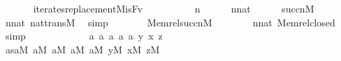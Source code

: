 \begin{isabellebody}
\ \ \isanewline
\ \ \ \ {\isachardoublequoteopen}iterates{\isacharunderscore}{\kern0pt}replacement{\isacharparenleft}{\kern0pt}{\isacharhash}{\kern0pt}{\isacharhash}{\kern0pt}M{\isacharcomma}{\kern0pt}is{\isacharunderscore}{\kern0pt}F{\isacharcomma}{\kern0pt}v{\isacharparenright}{\kern0pt}{\isachardoublequoteclose}\isanewline
%
\isadelimproof
%
\endisadelimproof
%
\isatagproof
{}\isamarkupfalse%
\ {\isacharminus}{\kern0pt}\isanewline
\ \ \isacommand{{\isacharbraceleft}{\kern0pt}}\isamarkupfalse%
\isanewline
\ \ \ \ \isamarkupfalse%
\ n\isanewline
\ \ \ \ \isamarkupfalse%
\ {\isachardoublequoteopen}n{\isasymin}nat{\isachardoublequoteclose}\isanewline
\ \ \ \ \isamarkupfalse%
\ {\isachardoublequoteopen}succ{\isacharparenleft}{\kern0pt}n{\isacharparenright}{\kern0pt}{\isasymin}M{\isachardoublequoteclose}\isanewline
\ \ \ \ \ \ \isamarkupfalse%
\ {\isacartoucheopen}n{\isasymin}nat{\isacartoucheclose}\ nat{\isacharunderscore}{\kern0pt}trans{\isacharunderscore}{\kern0pt}M\ \isamarkupfalse%
\ simp\isanewline
\ \ \ \ \isamarkupfalse%
\ \isamarkupfalse%
\ {}{\isacharcolon}{\kern0pt}{\isachardoublequoteopen}Memrel{\isacharparenleft}{\kern0pt}succ{\isacharparenleft}{\kern0pt}n{\isacharparenright}{\kern0pt}{\isacharparenright}{\kern0pt}{\isasymin}M{\isachardoublequoteclose}\isanewline
\ \ \ \ \ \ \isamarkupfalse%
\ {\isacartoucheopen}n{\isasymin}nat{\isacartoucheclose}\ Memrel{\isacharunderscore}{\kern0pt}closed\ \isamarkupfalse%
\ simp\isanewline
\ \ \ \ \isacommand{{\isacharbraceleft}{\kern0pt}}\isamarkupfalse%
\isanewline
\ \ \ \ \ \ \isamarkupfalse%
\ a{}\ a{}\ a{}\ a{}\ a{}\ y\ x\ z\isanewline
\ \ \ \ \ \ \isamarkupfalse%
\ as{\isacharcolon}{\kern0pt}{\isachardoublequoteopen}a{}{\isasymin}M{\isachardoublequoteclose}\ {\isachardoublequoteopen}a{}{\isasymin}M{\isachardoublequoteclose}\ {\isachardoublequoteopen}a{}{\isasymin}M{\isachardoublequoteclose}\ {\isachardoublequoteopen}a{}{\isasymin}M{\isachardoublequoteclose}\ {\isachardoublequoteopen}a{}{\isasymin}M{\isachardoublequoteclose}\ {\isachardoublequoteopen}y{\isasymin}M{\isachardoublequoteclose}\ {\isachardoublequoteopen}x{\isasymin}M{\isachardoublequoteclose}\ {\isachardoublequoteopen}z{\isasymin}M{\isachardoublequoteclose}\isanewline
\ \ \ \ \ \ \isamarkupfalse%

\end{isabellebody}
